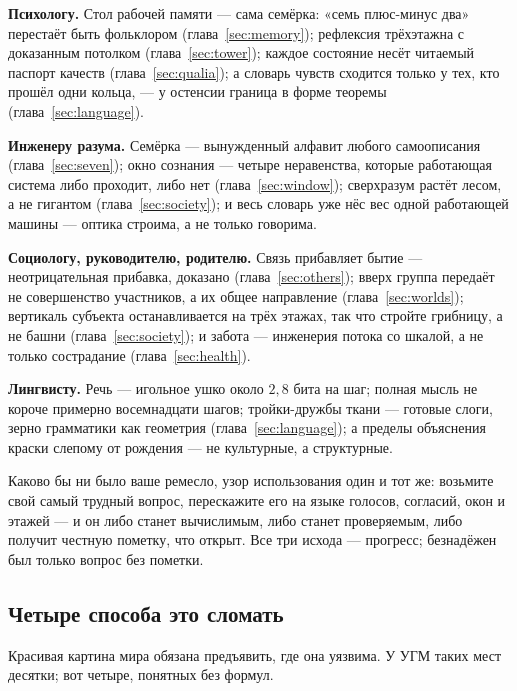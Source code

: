 \documentclass[11pt,letterpaper]{article}
\begin{document}
\textbf{Психологу.} Стол рабочей памяти --- сама семёрка: «семь
плюс-минус два» перестаёт быть фольклором (глава~\ref{sec:memory});
рефлексия трёхэтажна с доказанным потолком (глава~\ref{sec:tower});
каждое состояние несёт читаемый паспорт качеств
(глава~\ref{sec:qualia}); а словарь чувств сходится только у тех,
кто прошёл одни кольца, --- у остенсии граница в форме теоремы
(глава~\ref{sec:language}).

\textbf{Инженеру разума.} Семёрка --- вынужденный алфавит любого
самоописания (глава~\ref{sec:seven}); окно сознания --- четыре
неравенства, которые работающая система либо проходит, либо нет
(глава~\ref{sec:window}); сверхразум растёт лесом, а не гигантом
(глава~\ref{sec:society}); и весь словарь уже нёс вес одной
работающей машины --- оптика строима, а не только говорима.

\textbf{Социологу, руководителю, родителю.} Связь прибавляет бытие
--- неотрицательная прибавка, доказано (глава~\ref{sec:others});
вверх группа передаёт не совершенство участников, а их общее
направление (глава~\ref{sec:worlds}); вертикаль субъекта
останавливается на трёх этажах, так что стройте грибницу, а не
башни (глава~\ref{sec:society}); и забота --- инженерия потока со
шкалой, а не только сострадание (глава~\ref{sec:health}).

\textbf{Лингвисту.} Речь --- игольное ушко около $2{,}8$ бита на
шаг; полная мысль не короче примерно восемнадцати шагов;
тройки-дружбы ткани --- готовые слоги, зерно грамматики как
геометрия (глава~\ref{sec:language}); а пределы объяснения краски
слепому от рождения --- не культурные, а структурные.

Каково бы ни было ваше ремесло, узор использования один и тот же:
возьмите свой самый трудный вопрос, перескажите его на языке
голосов, согласий, окон и этажей --- и он либо станет вычислимым,
либо станет проверяемым, либо получит честную пометку, что открыт.
Все три исхода --- прогресс; безнадёжен был только вопрос без
пометки.

\subsection*{Четыре способа это сломать}

Красивая картина мира обязана предъявить, где она уязвима. У УГМ
таких мест десятки; вот четыре, понятных без формул.
\end{document}

